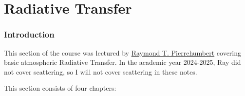 \part{Radiative Transfer}\label{Radiative Transfer}

\section*{Introduction}

This section of the course was lectured by \href{https://users.physics.ox.ac.uk/~pierrehumbert/}{Raymond T. Pierrehumbert} covering basic atmospheric Radiative Transfer. In the academic year 2024-2025, Ray did not cover scattering, so I will not cover scattering in these notes.\vspace{5 mm}

\noindent This section consists of four chapters:\vspace{5 mm}

